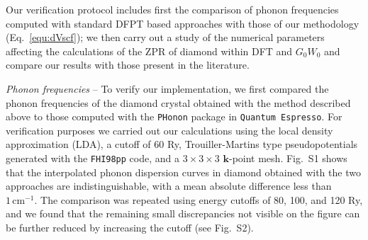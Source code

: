 \documentclass[journal=jctcce,manuscript=article]{achemso}
\newcommand{\bfk}{{\mathbf{k}}}
\newcommand{\bfq}{{\mathbf{q}}}
\begin{document}
Our verification protocol includes first the comparison of phonon frequencies computed with standard DFPT based approaches with those of our methodology (Eq.~\ref{equ:dVscf}); we then carry out a study of the numerical parameters affecting the calculations of the ZPR of diamond within DFT and $G_0W_0$ and compare our results with those present in the literature.

{\it Phonon frequencies} -- To verify our implementation, we first compared the phonon frequencies of the diamond crystal obtained with the method described above to those computed with the \texttt{PHonon} package in \texttt{Quantum Espresso}\cite{giannozzi2009quantum}. For verification purposes we carried out our calculations using the local density approximation (LDA), a cutoff of 60 Ry, Trouiller-Martins type pseudopotentials\cite{troullier1991efficient} generated with the \texttt{FHI98pp} code\cite{fhi98pp}, and a $3\times3\times3$ $\bfk$-point mesh. 
Fig.~S1 shows that the interpolated phonon dispersion curves in diamond obtained with the two approaches are indistinguishable, with a mean absolute difference less than  $1\,\mathrm{cm^{-1}}$. The comparison was repeated using energy cutoffs of 80, 100, and 120 Ry, and we found that the remaining small discrepancies not visible on the figure can be further reduced by increasing the cutoff (see Fig.~S2). 


\end{document}
